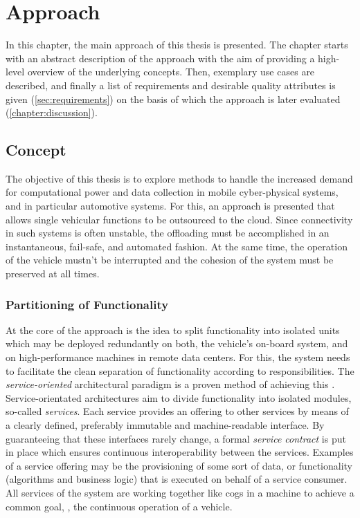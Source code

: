 
\chapter{Approach}\label{chapter:approach}

In this chapter, the main approach of this thesis is presented. The chapter starts with an abstract description of the approach with the aim of providing a high-level overview of the underlying concepts. Then, exemplary use cases are described, and finally a list of requirements and desirable quality attributes is given (\autoref{sec:requirements}) on the basis of which the approach is later evaluated (\autoref{chapter:discussion}). 

%
%
%
%
%
%
%
%
%
%

\section{Concept} \label{sec:concept}
The objective of this thesis is to explore methods to handle the increased demand for computational power and data collection in mobile cyber-physical systems, and in particular automotive systems. For this, an approach is presented that allows single vehicular functions to be outsourced to the cloud.
Since connectivity in such systems is often unstable, the offloading must be accomplished in an instantaneous, fail-safe, and automated fashion. At the same time, the operation of the vehicle mustn't be interrupted and the cohesion of the system must be preserved at all times. 

\subsection{Partitioning of Functionality}
At the core of the approach is the idea to split functionality into isolated units which may be deployed redundantly on both, the vehicle's on-board system, and on high-performance machines in remote data centers. For this, the system needs to facilitate the clean separation of functionality according to responsibilities. The \emph{service-oriented} architectural paradigm is a proven method of achieving this . Service-orientated architectures aim to divide functionality into isolated modules, so-called \emph{services}. Each service provides an offering to other services by means of a clearly defined, preferably immutable and machine-readable interface. By guaranteeing that these interfaces rarely change, a formal \emph{service contract} is put in place which ensures continuous interoperability between the services. Examples of a service offering may be the provisioning of some sort of data, or functionality (algorithms and business logic) that is executed on behalf of a service consumer. All services of the system are working together like cogs in a machine to achieve a common goal, \ie , the continuous operation of a vehicle. 


